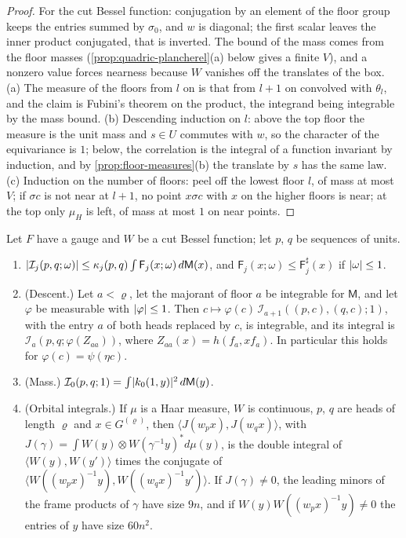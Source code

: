 \begin{proof}
For the cut Bessel function: conjugation by an element of the floor group keeps the entries summed by $\sigma_0$, and $w$ is diagonal; the first scalar leaves the inner product conjugated, that is inverted. The bound of the mass
comes from the floor masses (\cref{prop:quadric-plancherel}(a) below gives a finite $V$), and a nonzero value forces nearness because $W$ vanishes off the translates of the box. (a) The measure of the floors from $l$ on is that from
$l+1$ on convolved with $\theta_l$, and the claim is Fubini's theorem on the product, the integrand being integrable by the mass bound. (b) Descending induction on $l$: above the top floor the measure is the unit mass and
$s\in U$ commutes with $w$, so the character of the equivariance is $1$; below, the correlation is the integral of a function invariant by induction, and by \cref{prop:floor-measures}(b) the translate by $s$ has the same law.
(c) Induction on the number of floors: peel off the lowest floor $l$, of mass at most $V$; if $\sigma c$ is not near at $l+1$, no point $x\sigma c$ with $x$ on the higher floors is near; at the top only $\mu_H$ is left, of mass at most $1$ on near points.
\end{proof}

\begin{theorem}\label{thm:floor-descent}
Let $F$ have a gauge and $W$ be a cut Bessel function; let $p$, $q$ be sequences of units.
\begin{enumerate}[label=\textup{(\alph*)}]
\item $\lvert \mathcal I_j(p,q;\omega)\rvert\le\kappa_j(p,q)\int\mathsf F_j(x;\omega)\,d\mathsf M(x)$, and $\mathsf F_j(x;\omega)\le\mathsf F^\sharp_j(x)$ if $\lvert \omega\rvert\le1$.
\item (Descent.) Let $a<\varrho$, let the majorant of floor $a$ be integrable for $\mathsf M$, and let $\varphi$ be measurable with $\lvert \varphi\rvert\le1$. Then $c\mapsto\varphi(c)\,\mathcal I_{a+1}((p,c),(q,c);1)$, with the entry
$a$ of both heads replaced by $c$, is integrable, and its integral is $\mathcal I_a(p,q;\varphi(Z_{aa}))$, where $Z_{aa}(x)=h(f_a,xf_a)$. In particular this holds for $\varphi(c)=\psi(\eta c)$.
\item (Mass.) $\mathcal I_0(p,q;1)=\int\lvert k_0(1,y)\rvert^2\,d\mathsf M(y)$.
\item (Orbital integrals.) If $\mu$ is a Haar measure, $W$ is continuous, $p$, $q$ are heads of length $\varrho$ and $x\in G^{(\varrho)}$, then $\langle J(w_px),J(w_qx)\rangle$, with $J(\gamma)=\int W(y)\otimes W(\gamma^{-1}y)^*d\mu(y)$,
is the double integral of $\langle W(y),W(y')\rangle$ times the conjugate of $\langle W((w_px)^{-1}y),W((w_qx)^{-1}y')\rangle$. If $J(\gamma)\ne0$, the leading minors of the frame products of $\gamma$ have size $9n$, and
if $W(y)W((w_px)^{-1}y)\ne0$ the entries of $y$ have size $60n^2$.
\end{enumerate}
\end{theorem}

